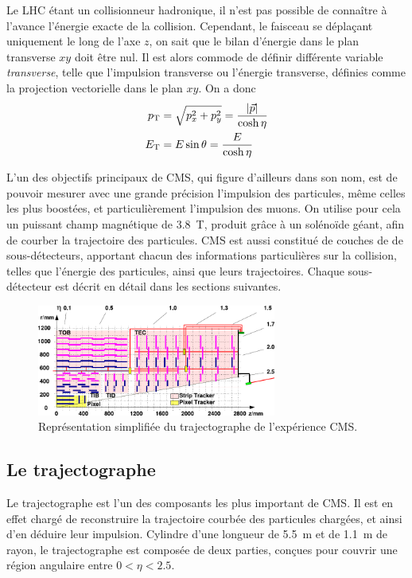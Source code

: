 Le LHC étant un collisionneur hadronique, il n'est pas possible de connaître à l'avance l'énergie exacte de la collision. Cependant, le faisceau se déplaçant uniquement le long de l'axe $z$, on sait que le bilan d'énergie dans le plan transverse $xy$ doit être nul. Il est alors commode de définir différente variable \emph{transverse}, telle que l'impulsion transverse ou l'énergie transverse, définies comme la projection vectorielle dans le plan $xy$. On a donc
\begin{align*}
  p_{\mathrm{T}} &= \sqrt{p_x^2 + p_y^2} = \frac{\lvert \vec{p} \rvert}{\cosh\eta} \\
  E_{\mathrm{T}} &= E \sin\theta = \frac{E}{\cosh\eta}
\end{align*}


L'un des objectifs principaux de CMS, qui figure d'ailleurs dans son nom, est de pouvoir mesurer avec une grande précision l'impulsion des particules, même celles les plus boostées, et particulièrement l'impulsion des muons. On utilise pour cela un puissant champ magnétique de \SI{3.8}{\tesla}, produit grâce à un solénoïde géant, afin de courber la trajectoire des particules. CMS est aussi constitué de couches de de sous-détecteurs, apportant chacun des informations particulières sur la collision, telles que l'énergie des particules, ainsi que leurs trajectoires. Chaque sous-détecteur est décrit en détail dans les sections suivantes.

\begin{figure}[t] \centering
  \includegraphics[width=0.7\textwidth]{chapitre2/figs/tracker.pdf}
  \caption{Représentation simplifiée du trajectographe de l'expérience CMS.}
  \label{fig:tracker}
\end{figure}

\subsection{Le trajectographe}

Le trajectographe est l'un des composants les plus important de CMS. Il est en effet chargé de reconstruire la trajectoire courbée des particules chargées, et ainsi d'en déduire leur impulsion. Cylindre d'une longueur de \SI{5.5}{\m} et de \SI{1.1}{\m} de rayon, le trajectographe est composée de deux parties, conçues pour couvrir une région angulaire entre $0 < \eta < \num{2.5}$.

